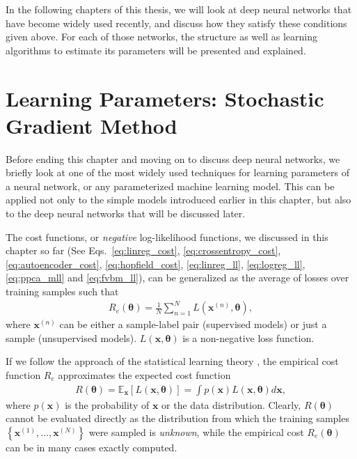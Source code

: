 \documentclass[dissertation,nocontribution,draft*]{aaltoseries}
\newcommand{\vect}[1]{\mathbf{#1}}
\newcommand{\vects}[1]{\boldsymbol{#1}}
\newcommand{\vx}[0]{\vect{x}}
\newcommand{\TT}[0]{{\vects{\theta}}}
\newcommand{\E}[0]{\mathbb{E}}
\begin{document}
In the following chapters of this thesis, we will look at
deep neural networks that have become widely used recently,
and discuss how they satisfy these conditions given above.
For each of those networks, the structure as well as
learning algorithms to estimate its parameters will be
presented and explained.

\section{Learning Parameters: Stochastic Gradient Method}
\label{sec:stochastic_grad}

Before ending this chapter and moving on to discuss deep
neural networks, we briefly look at one of the most widely
used techniques for learning parameters of a neural network,
or any parameterized machine learning model.  This can be
applied not only to the simple models introduced
earlier in this chapter, but also to the deep neural networks
that will be discussed later.

The cost functions, or \textit{negative} log-likelihood
functions, we discussed in this chapter so far (See
Eqs.~\eqref{eq:linreg_cost}, \eqref{eq:crossentropy_cost},
\eqref{eq:autoencoder_cost}, \eqref{eq:hopfield_cost},
\eqref{eq:linreg_ll}, \eqref{eq:logreg_ll},
\eqref{eq:ppca_mll} and \eqref{eq:fvbm_ll}), can be
generalized as the average of losses over training samples such
that
\begin{align}
    \label{eq:slt_emp_cost}
    R_e(\TT) = \frac{1}{N} \sum_{n=1}^N L(\vx^{(n)}, \TT),
\end{align}
where $\vx^{(n)}$ can be either a sample-label pair
(supervised models) or just a sample (unsupervised models).
$L(\vx, \TT)$ is a non-negative loss function.

If we follow the approach of the statistical learning theory
\citep[see, e.g.][]{Vapnik1995}, the empirical cost function
$R_e$ approximates the expected cost function 
\begin{align}
    \label{eq:slt_exp_cost}
    R(\TT) = \E_{\vx} \left[ L(\vx, \TT) \right] = \int
    p(\vx) L(\vx, \TT) d\vx,
\end{align}
where $p(\vx)$ is the probability of $\vx$ or the data
distribution. Clearly, $R(\TT)$ cannot be evaluated directly
as the distribution from which the training samples $\left\{
\vx^{(1)}, \dots, \vx^{(N)} \right\}$ were sampled is
\textit{unknown}, while the empirical cost $R_e(\TT)$
can be in many cases exactly computed.
\end{document}
